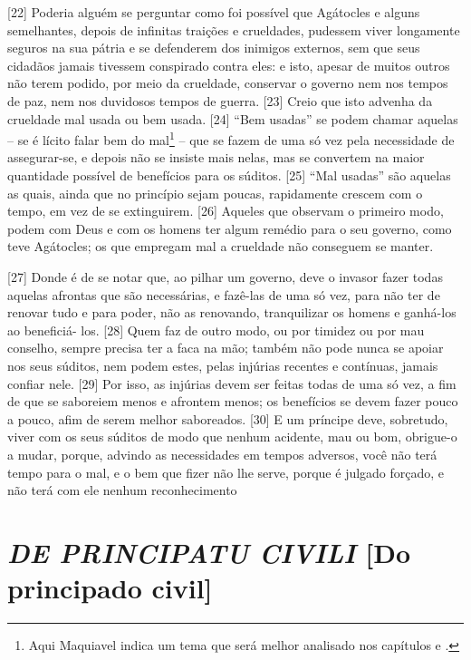 {[}22{]} Poderia alguém se perguntar como foi possível que Agátocles e
alguns semelhantes, depois de infinitas traições e crueldades, pudessem
viver longamente seguros na sua pátria e se defenderem dos inimigos
externos, sem que seus cidadãos jamais tivessem conspirado contra eles:
e isto, apesar de muitos outros não terem podido, por meio da crueldade,
conservar o governo nem nos tempos de paz, nem nos duvidosos tempos de
guerra. {[}23{]} Creio que isto advenha da crueldade mal usada ou bem
usada. {[}24{]} ``Bem usadas'' se podem chamar aquelas -- se é lícito
falar bem do mal\footnote{Aqui Maquiavel indica um tema que será melhor
  analisado nos capítulos  e .} -- que se fazem de uma só vez pela
necessidade de assegurar-se, e depois não se insiste mais nelas, mas se
convertem na maior quantidade possível de benefícios para os súditos.
{[}25{]} ``Mal usadas'' são aquelas as quais, ainda que no princípio
sejam poucas, rapidamente crescem com o tempo, em vez de se extinguirem.
{[}26{]} Aqueles que observam o primeiro modo, podem com Deus e com os
homens ter algum remédio para o seu governo, como teve Agátocles; os que
empregam mal a crueldade não conseguem se manter.

{[}27{]} Donde é de se notar que, ao pilhar um governo, deve o invasor
fazer todas aquelas afrontas que são necessárias, e fazê-las de uma só
vez, para não ter de renovar tudo e para poder, não as renovando,
tranquilizar os homens e ganhá-los ao beneficiá- los. {[}28{]} Quem faz
de outro modo, ou por timidez ou por mau conselho, sempre precisa ter a
faca na mão; também não pode nunca se apoiar nos seus súditos, nem podem
estes, pelas injúrias recentes e contínuas, jamais confiar nele.
{[}29{]} Por isso, as injúrias devem ser feitas todas de uma só vez, a
fim de que se saboreiem menos e afrontem menos; os benefícios se devem
fazer pouco a pouco, afim de serem melhor saboreados. {[}30{]} E um
príncipe deve, sobretudo, viver com os seus súditos de modo que nenhum
acidente, mau ou bom, obrigue-o a mudar, porque, advindo as necessidades
em tempos adversos, você não terá tempo para o mal, e o bem que fizer
não lhe serve, porque é julgado forçado, e não terá com ele nenhum
reconhecimento

\quebra\section{\emph{DE PRINCIPATU CIVILI}\break
{[}Do principado civil{]}}


